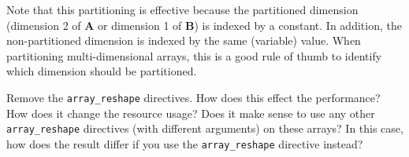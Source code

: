 

\begin{aside}
Note that this partitioning is effective because the partitioned dimension (dimension 2 of $\mathbf{A}$ or dimension 1 of $\mathbf{B}$) is indexed by a constant.   In addition, the non-partitioned dimension is indexed by the same (variable) value.  When partitioning multi-dimensional arrays, this is a good rule of thumb to identify which dimension should be partitioned.
\end{aside}

\begin{exercise}
Remove the \lstinline{array_reshape} directives. How does this effect the performance? How does it change the resource usage? Does it make sense to use any other \lstinline{array_reshape} directives (with different arguments) on these arrays?  In this case, how does the result differ if you use the \lstinline{array_reshape} directive instead?
\end{exercise}

